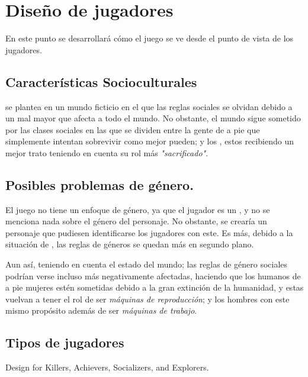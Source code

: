 
\section{Diseño de jugadores}
    En este punto se desarrollará cómo el juego se ve desde el punto de vista de los jugadores.
    \subsection{Características Socioculturales}
        \TWD se plantea en un mundo ficticio en el que las
        reglas sociales se olvidan debido a un mal mayor que afecta a todo el mundo. No obstante, el mundo sigue sometido por las clases sociales en las que se dividen entre la gente de a pie que simplemente intentan sobrevivir como mejor pueden; y los \hunters, estos recibiendo un mejor trato teniendo en cuenta su rol más \textit{"sacrificado"}.
    \subsection{Posibles problemas de género.}
        El juego no tiene un enfoque de género, ya que el jugador es un \hunters, y no se menciona nada sobre el género del personaje. No obstante, se crearía un personaje que pudiesen identificarse los jugadores con este. Es más, debido a la situación de \humanity, las reglas de géneros se quedan más en segundo plano.

        Aun así, teniendo en cuenta el estado del mundo; las reglas de género sociales podrían verse incluso más negativamente afectadas, haciendo que los humanos de a pie mujeres estén sometidas debido a la gran extinción de la humanidad, y estas vuelvan a tener el rol de ser \textit{máquinas de reproducción}; y los hombres con este mismo propósito además de ser \textit{máquinas de trabajo}.
    \subsection{Tipos de jugadores}
    Design for Killers, Achievers, Socializers, and Explorers.
